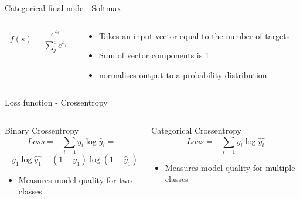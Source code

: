 \begin{frame}{Categorical final node - Softmax}
    \begin{columns}
        \begin{column}{0.5\textwidth}
            \begingroup
            \huge
            \begin{equation*}
                f(s)=\frac{e^{s_i}}{\sum_j^c e^{s_j}}
            \end{equation*}
            \endgroup
        \end{column}
        \begin{column}{0.5\textwidth}
            \begin{itemize}
                \item Takes an input vector equal to the number of targets
                \vspace{0.1cm}
                \item Sum of vector components is 1
                \vspace{0.1cm}
                \item normalises output to a probability distribution
            \end{itemize}
        \end{column}
    \end{columns}
\end{frame}

\begin{frame}{Loss function - Crossentropy}
    \begin{columns}
        \begin{column}{0.5\textwidth}
            \begin{block}{Binary Crossentropy}
                \begin{equation*}
                    Loss = - \sum_{i=1} y_i \log \hat{y}_i =
                \end{equation*}
                \begin{equation*}
                    -y_1 \log \hat{y_1} - (1-y_1) \log (1-\hat{y}_1)
                \end{equation*}
                \begin{itemize}
                    \item Measures model quality for two classes
                \end{itemize}
            \end{block}
        \end{column}
        \begin{column}{0.5\textwidth}
            \begin{block}{Categorical Crossentropy}
                \begin{equation*}
                    Loss = - \sum_{i=1} y_i \log \hat{y_i}
                \end{equation*}
                \begin{itemize}
                    \item Measures model quality for multiple classes
                \end{itemize}
            \end{block}
        \end{column}
    \end{columns}
\end{frame}
